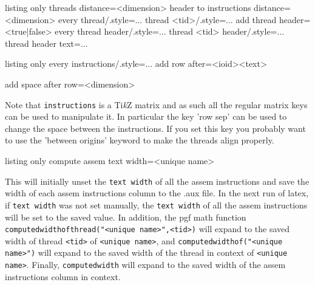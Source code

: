 \documentclass[a4paper]{article}
\newcommand{\TikZ}{Ti\textit{k}Z}
\begin{document}
\begin{tcblisting}{listing only}
threads distance=<dimension> %
header to instructions distance=<dimension> %
every thread/.style={...} %
thread <tid>/.style={...}
add thread header=<true|false> %
every thread header/.style={...} %
thread <tid> header/.style={...}
thread header text={...} %
\end{tcblisting}

\begin{tcblisting}{listing only}
every instructions/.style={...}
add row after={<ioid>}{<text>} %

add space after row=<dimension>
\end{tcblisting}
Note that \lstinline|instructions| is a \TikZ{} matrix and as such all the
regular matrix keys can be used to manipulate it. In particular the key
'row sep' can be used to change the space between the instructions. If
you set this key you probably want to use the 'between origins' keyword
to make the threads align properly.

\begin{tcblisting}{listing only}
compute assem text width={<unique name>} %
\end{tcblisting}
This will initially unset the \lstinline|text width| of all the assem instructions
and save the width of each assem instructions column to the .aux file.
In the next run of latex, if \lstinline|text width| was not set manually, the
\lstinline|text width| of all the assem instructions will be set to the saved
value.
In addition, the pgf math function
\lstinline+computedwidthofthread("<unique name>",<tid>)+ will expand
to the saved width of thread \lstinline|<tid>| of \lstinline|<unique name>|, and
\lstinline+computedwidthof("<unique name>")+ will expand to the saved
width of the thread in context of \lstinline|<unique name>|. Finally,
\lstinline+computedwidth+ will expand to the saved width of the assem
instructions column in context.
\end{document}
